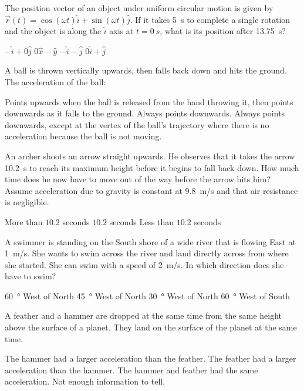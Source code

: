 \question The position vector of an object under uniform circular motion is given by \\ $\vec r(t)= \cos(\omega t) \hat i + \sin(\omega t)\hat{j}$. If it takes \SI{5}{s} to complete a single rotation and the object is along the $\hat{i}$ axis at $t=\SI{0}{s}$, what is its position after \SI{13.75}{s}?  
\begin{checkboxes}
\choice $-\hat{i}+0\hat{j}$
\CorrectChoice $0\hat{x}-\hat{y}$
\choice $-\hat{i}-\hat{j}$
\choice $0\hat{i}+\hat{j}$
\end{checkboxes}

\question A ball is thrown vertically upwards, then falls back down and hits the ground. The acceleration of the ball:
\begin{checkboxes}
\choice Points upwards when the ball is released from the hand throwing it, then points downwards as it falls to the ground.
\CorrectChoice Always points downwards. \correct
\choice Always points downwards, except at the vertex of the ball's trajectory where there is no acceleration because the ball is not moving.
\end{checkboxes}

\question An archer shoots an arrow straight upwards. He observes that it takes the arrow \SI{10.2}{s} to reach its maximum height before it begins to fall back down. How much time does he now have to move out of the way before the arrow hits him? Assume acceleration due to gravity is constant at \SI{9.8}{m/s} and that air resistance is negligible.
\begin{checkboxes}
\choice More than $10.2$ seconds
\CorrectChoice $10.2$ seconds \correct
\choice Less than $10.2$ seconds
\end{checkboxes}


\question A swimmer is standing on the South shore of a wide river that is flowing East at \SI{1}{m/s}. She wants to swim across the river and land directly across from where she started. She can swim with a speed of \SI{2}{m/s}. In which direction does she have to swim?
\begin{checkboxes} 
\choice \SI{60}{\degree} West of North
\choice \SI{45}{\degree} West of North
\CorrectChoice \SI{30}{\degree} West of North \correct
\choice \SI{60}{\degree} West of South
\end{checkboxes}


\question A feather and a hammer are dropped at the same time from the same height above the surface of a planet. They land on the surface of the planet at the same time.
\begin{checkboxes}
\choice The hammer had a larger acceleration than the feather.
\choice The feather had a larger acceleration than the hammer.
\CorrectChoice The hammer and feather had the same acceleration.
\choice Not enough information to tell.
\end{checkboxes}

